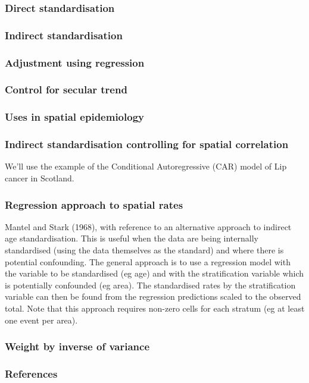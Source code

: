 \documentclass[a4paper]{beamer}
\begin{document}
\begin{frame}
\frametitle{Direct standardisation}
\label{sec-11}
\end{frame}
\begin{frame}
\frametitle{Indirect standardisation}
\label{sec-12}
\end{frame}
\begin{frame}
\frametitle{Adjustment using regression}
\label{sec-13}
\end{frame}
\begin{frame}
\frametitle{Control for secular trend}
\label{sec-14}
\end{frame}
\begin{frame}
\frametitle{Uses in spatial epidemiology}
\label{sec-15}
\end{frame}
\begin{frame}
\frametitle{Indirect standardisation controlling for spatial correlation}
\label{sec-16}

We'll use the example of the Conditional Autoregressive (CAR) model of Lip cancer in Scotland.
\end{frame}
\begin{frame}
\frametitle{Regression approach to spatial rates}
\label{sec-17}

Mantel and Stark (1968), with reference to an alternative approach to indirect age standardisation. This is useful when the data are being internally standardised (using the data themselves as the standard) 
and where there is potential confounding. The general approach is to use a regression model with the variable to be standardised (eg age) and with the stratification variable which is potentially confounded (eg area). 
The standardised rates by the stratification variable can then be found from the regression predictions scaled to the observed total. Note that this approach requires non-zero cells for each stratum (eg at least one event per area).
\end{frame}
\begin{frame}
\frametitle{Weight by inverse of variance}
\label{sec-18}
\end{frame}
\begin{frame}
\frametitle{References}
\label{sec-19}
\end{frame}
\end{document}
